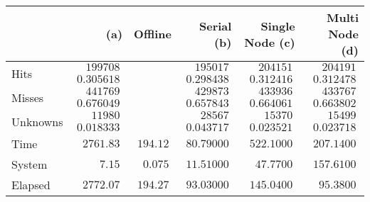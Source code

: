 




\newcommand{\mr}[1]{\multirow{2}{*}{#1}}

\begin{tabular}{l|r|r|r|r|r}
                &  (a)  & Offline       & Serial (b)      & Single Node (c) & Multi Node (d)  \\\hline
\mr{Hits}       & $\ 199708\ $   &               & $\ 195017\ $    & $\ 204151\ $    & $\ 204191\ $    \\
                & $\ 0.305618\ $ &               & $\ 0.298438\ $  & $\ 0.312416\ $  & $\ 0.312478\ $  \\
\hline
\mr{Misses}     & $\ 441769\ $   &               & $\ 429873\ $    & $\ 433936\ $    & $\ 433767\ $    \\
                & $\ 0.676049\ $ &               & $\ 0.657843\ $  & $\ 0.664061\ $  & $\ 0.663802\ $  \\
\hline
\mr{Unknowns}   & $\ 11980\ $    &               & $\ 28567\ $     & $\ 15370\ $     & $\ 15499\ $     \\
                & $\ 0.018333\ $ &               & $\ 0.043717\ $  & $\ 0.023521\ $  & $\ 0.023718\ $  \\
\hline
Time            & $\ 2761.83\ $  & $\ 194.12\ $  & $\ 80.79000\ $  & $\ 522.1000\ $  & $\ 207.1400\ $  \\\hline
System          & $\ 7.15\ $     & $\  0.075\ $  & $\ 11.51000\ $  & $\  47.7700\ $  & $\ 157.6100\ $  \\\hline
Elapsed         & $\ 2772.07\ $  & $\ 194.27\ $  & $\ 93.03000\ $  & $\ 145.0400\ $  & $\  95.3800\ $  
\end{tabular}

